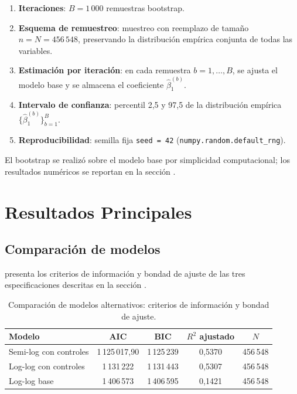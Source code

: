 \documentclass[doc, a4paper, biblatex, floatsintext, longtable, babel]{apa7}
\begin{document}
\begin{enumerate}
    \item \textbf{Iteraciones}: $B = 1\,000$ remuestras bootstrap.
    \item \textbf{Esquema de remuestreo}: muestreo con reemplazo de tama\~no $n = N = 456\,548$, preservando la distribuci\'on emp\'irica conjunta de todas las variables.
    \item \textbf{Estimaci\'on por iteraci\'on}: en cada remuestra $b = 1,\dots,B$, se ajusta el modelo base y se almacena el coeficiente $\hat{\beta}_1^{(b)}$.
    \item \textbf{Intervalo de confianza}: percentil 2,5 y 97,5 de la distribuci\'on emp\'irica $\{\hat{\beta}_1^{(b)}\}_{b=1}^B$.
    \item \textbf{Reproducibilidad}: semilla fija \texttt{seed = 42} (\texttt{numpy.random.default\_rng}).
\end{enumerate}

El bootstrap se realiz\'o sobre el modelo base por simplicidad computacional; los resultados num\'ericos se reportan en la secci\'on .

\section{Resultados Principales}
\label{sec:resultados}

\subsection{Comparaci\'on de modelos}
\label{subsec:comparacion_modelos}

 presenta los criterios de informaci\'on y bondad de ajuste de las tres especificaciones descritas en la secci\'on .

\begin{table}[!htbp]
\centering
\caption{Comparaci\'on de modelos alternativos: criterios de informaci\'on y bondad de ajuste.}
\label{tab:comparacion_modelos}
\begin{tabular}{lcccc}
\toprule
Modelo & AIC & BIC & $R^2$ ajustado & $N$ \\
\midrule
Semi-log con controles & 1\,125\,017,90 & 1\,125\,239 & 0,5370 & 456\,548 \\
Log-log con controles & 1\,131\,222 & 1\,131\,443 & 0,5307 & 456\,548 \\
Log-log base & 1\,406\,573 & 1\,406\,595 & 0,1421 & 456\,548 \\
\bottomrule
\end{tabular}
\end{table}
\end{document}
